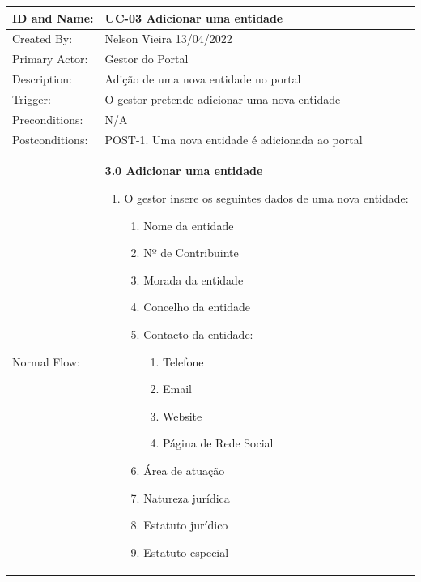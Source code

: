 \documentclass{scrreprt}
\begin{document}
\begin{table}[H]
    \centering
    \begin{adjustbox}{width=1.15\textwidth,center=\textwidth}
        \begin{tabular}{|m{4cm}|m{12cm}|}
            \hline
            ID and Name: & UC-03 Adicionar uma entidade \\
            \hline
            Created By: & Nelson Vieira 13/04/2022 \\
            \hline
            Primary Actor: & Gestor do Portal \\
            \hline
            Description: & Adição de uma nova entidade no portal \\
            \hline
            Trigger: & O gestor pretende adicionar uma nova entidade \\
            \hline
            Preconditions: & N/A \\
            \hline
            Postconditions: & POST-1. Uma nova entidade é adicionada ao portal \\
            \hline
            Normal Flow: & \textbf{3.0 Adicionar uma entidade}
            \begin{enumerate}
                \item O gestor insere os seguintes dados de uma nova entidade:
                \begin{enumerate}
                    \item Nome da entidade
                    \item Nº de Contribuinte
                    \item Morada da entidade
                    \item Concelho da entidade
                    \item Contacto da entidade:
                    \begin{enumerate}
                        \item Telefone
                        \item Email
                        \item Website
                        \item Página de Rede Social
                    \end{enumerate}
                    \item Área de atuação
                    \item Natureza jurídica
                    \item Estatuto jurídico
                    \item Estatuto especial

\end{enumerate}
\end{enumerate}
\end{tabular}
\end{adjustbox}
\end{table}
\end{document}
